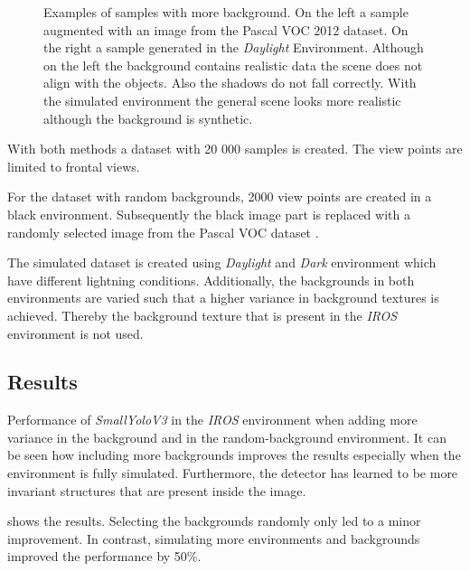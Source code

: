 \begin{figure}
\begin{minipage}{0.3\textwidth}
	\end{minipage}
	\caption{Examples of samples with more background. On the left a sample augmented with an image from the Pascal VOC 2012 dataset. On the right a sample generated in the \textit{Daylight} Environment. Although on the left the background contains realistic data the scene does not align with the objects. Also the shadows do not fall correctly. With the simulated environment the general scene looks more realistic although the background is synthetic.}
	\label{fig:sim_vs_voc}
\end{figure}

With both methods a dataset with 20 000 samples is created. The view points are limited to frontal views.

For the dataset with random backgrounds, 2000 view points are created in a black environment. Subsequently the black image part is replaced with a randomly selected image from the Pascal VOC dataset .

The simulated dataset is created using \textit{Daylight} and \textit{Dark} environment which have different lightning conditions. Additionally, the backgrounds in both environments are varied such that a higher variance in background textures is achieved. Thereby the background texture that is present in the \textit{IROS} environment is not used.


\subsection{Results}

\begin{table}[hbtp]
	\centering
	
	\caption{Performance of \textit{SmallYoloV3} in the \textit{IROS} environment when adding more variance in the background and in the random-background environment. It can be seen how including more backgrounds improves the results especially when the environment is fully simulated. Furthermore, the detector has learned to be more invariant structures that are present inside the image.}
	\label{tab:sim_vs_voc}
\end{table}

 shows the results. Selecting the backgrounds randomly only led to a minor improvement. In contrast, simulating more environments and backgrounds improved the performance by 50\%.

